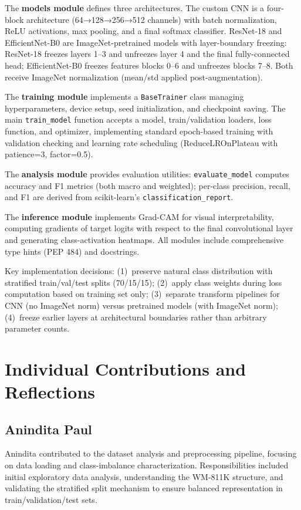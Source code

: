 \documentclass[conference]{IEEEtran}
\begin{document}
The \textbf{models module} defines three architectures. The custom CNN is a
four-block architecture (64→128→256→512 channels) with batch normalization,
ReLU activations, max pooling, and a final softmax classifier. ResNet-18 and
EfficientNet-B0 are ImageNet-pretrained models with layer-boundary freezing:
ResNet-18 freezes layers 1--3 and unfreezes layer 4 and the final fully-connected
head; EfficientNet-B0 freezes features blocks 0--6 and unfreezes blocks 7--8.
Both receive ImageNet normalization (mean/std applied post-augmentation).

The \textbf{training module} implements a \texttt{BaseTrainer} class managing
hyperparameters, device setup, seed initialization, and checkpoint saving. The
main \texttt{train\_model} function accepts a model, train/validation loaders,
loss function, and optimizer, implementing standard epoch-based training with
validation checking and learning rate scheduling (ReduceLROnPlateau with
patience=3, factor=0.5).

The \textbf{analysis module} provides evaluation utilities: \texttt{evaluate\_model}
computes accuracy and F1 metrics (both macro and weighted); per-class precision,
recall, and F1 are derived from scikit-learn's \texttt{classification\_report}.

The \textbf{inference module} implements Grad-CAM for visual interpretability,
computing gradients of target logits with respect to the final convolutional
layer and generating class-activation heatmaps. All modules include comprehensive
type hints (PEP 484) and docstrings.

Key implementation decisions: (1)~preserve natural class distribution with
stratified train/val/test splits (70/15/15); (2)~apply class weights during
loss computation based on training set only; (3)~separate transform pipelines
for CNN (no ImageNet norm) versus pretrained models (with ImageNet norm);
(4)~freeze earlier layers at architectural boundaries rather than arbitrary
parameter counts.

\section*{Individual Contributions and Reflections}
\label{sec:contributions}

\subsection*{Anindita Paul}
Anindita contributed to the dataset analysis and preprocessing pipeline,
focusing on data loading and class-imbalance characterization. Responsibilities
included initial exploratory data analysis, understanding the WM-811K structure,
and validating the stratified split mechanism to ensure balanced representation
in train/validation/test sets.
\end{document}
